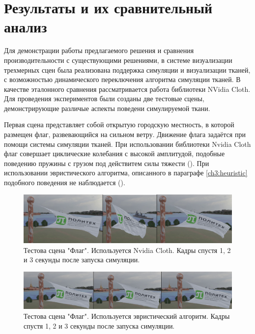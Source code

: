 \chapter{Результаты и их сравнительный анализ} \label{ch4}
	Для демонстрации работы предлагаемого решения и сравнения производительности с существующими решениями, в системе визуализации трехмерных сцен  была реализована поддержка симуляции и визуализации тканей, с возможностью динамического переключения алгоритма симуляции тканей. В качестве эталонного сравнения рассматривается работа библиотеки NVidia Cloth. Для проведения экспериментов были созданы две тестовые сцены, демонстрирующие различые аспекты поведени симулируемой ткани. 
	
	Первая сцена представляет собой открытую городскую местность, в которой размещен флаг, развевающийся на сильном ветру. Движение флага задаётся при помощи системы симуляции тканей. При использовании библиотеки Nvidia Cloth флаг совершает циклические колебания с высокой амплитудой, подобные поведению пружины с грузом под действитем силы тяжести (). При использовании эвристического алгоритма, описанного в параграфе \ref{ch3:heuristic} подобного поведения не наблюдается ().
	
	\begin{figure}[ht!] 
		\center
		\includegraphics [scale=0.25] {my_folder/images//streching}	
		\caption{Тестова сцена "Флаг". Используется Nvidia Cloth. Кадры спустя 1, 2 и 3 секунды после запуска симуляции.} 
		\label{fig:flagStreching}
	\end{figure}
	
	\begin{figure}[ht!] 
		\center
		\includegraphics [scale=0.2] {my_folder/images//notStreching}	
		\caption{Тестова сцена "Флаг". Используется эвристический алгоритм. Кадры спустя 1, 2 и 3 секунды после запуска симуляции.} 
		\label{fig:flagNotStreching}
	\end{figure}
	
